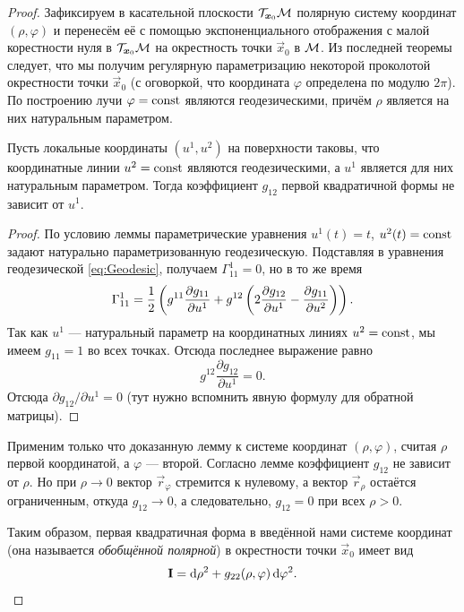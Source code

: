 \begin{proof}
	Зафиксируем в касательной плоскости $\mathcal{T}_{\boldsymbol{x}_0}\mathcal{M}$ полярную систему координат $(\rho, \varphi)$ и перенесём её с помощью экспоненциального отображения с малой корестности нуля в $\mathcal{T}_{\boldsymbol{x}_0}\mathcal{M}$ на окрестность точки $\vec{x}_0$ в $\mathcal{M}$. Из последней теоремы следует, что мы получим регулярную параметризацию некоторой проколотой окрестности точки $\vec{x}_0$ (с оговоркой, что координата $\varphi$ определена по модулю $2\pi$). По построению лучи $\varphi = \mathrm{const}$ являются геодезическими, причём $\rho$ является на них натуральным параметром.

	\begin{lemma} \label{lemma:g12}
		Пусть локальные координаты $(u^1, u^2)$ на поверхности таковы, что координатные линии $u^2 = \mathrm{const}$ являются геодезическими, а $u^1$ является для них натуральным параметром. Тогда коэффициент $g_{12}$ первой квадратичной формы не зависит от $u^1$.
	\end{lemma}

	\begin{proof}
		По условию леммы параметрические уравнения $u^1(t) = t$, $u^2(t) \hm= \const$ задают натурально параметризованную геодезическую. Подставляя в уравнения геодезической \eqref{eq:Geodesic}, получаем $\Gamma_{11}^1 = 0$, но в то же время
		\[
			\Gamma_{11}^1 = \frac{1}{2}\left(g^{11}\frac{\partial g_{11}}{\partial u^1} + g^{12}\left(2\frac{\partial g_{12}}{\partial u^1} - \frac{\partial g_{11}}{\partial u^2}\right)\right).
		\]
		Так как $u^1$ --- натуральный параметр на координатных линиях $u^2 = \mathrm{const}$, мы имеем $g_{11} = 1$ во всех точках. Отсюда последнее выражение равно
		\[
			g^{12}\frac{\partial g_{12}}{\partial u^1} = 0.
		\]
		Отсюда $\partial g_{12} / \partial u^1 = 0$ (тут нужно вспомнить явную формулу для обратной матрицы).
	\end{proof}

	Применим только что доказанную лемму к системе координат $(\rho, \varphi)$, считая $\rho$ первой координатой, а $\varphi$ --- второй. Согласно лемме коэффициент $g_{12}$ не зависит от $\rho$. Но при $\rho \to 0$ вектор $\vec{r}_\varphi$ стремится к нулевому, а вектор $\vec{r}_\rho$ остаётся ограниченным, откуда $g_{12} \to 0$, а следовательно, $g_{12} = 0$ при всех $\rho > 0$.

	Таким образом, первая квадратичная форма в введённой нами системе координат (она называется \textit{обобщённой полярной}) в окрестности точки $\vec{x}_0$ имеет вид
	\[
		\boldsymbol{\operatorname{I}} = \mathop{}\!\mathrm{d}\rho^2 + g_{22}(\rho, \varphi)\mathop{}\!\mathrm{d}\varphi^2.
	\]


\end{proof}
